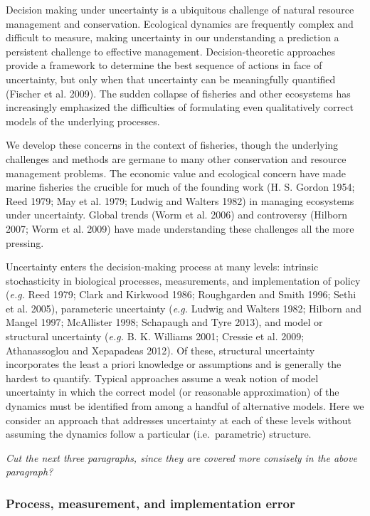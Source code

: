 \documentclass[author-year, review]{elsarticle} %
\begin{document}
Decision making under uncertainty is a ubiquitous challenge of natural
resource management and conservation. Ecological dynamics are frequently
complex and difficult to measure, making uncertainty in our
understanding a prediction a persistent challenge to effective
management. Decision-theoretic approaches provide a framework to
determine the best sequence of actions in face of uncertainty, but only
when that uncertainty can be meaningfully quantified (Fischer et al.
2009). The sudden collapse of fisheries and other ecosystems has
increasingly emphasized the difficulties of formulating even
qualitatively correct models of the underlying processes.

We develop these concerns in the context of fisheries, though the
underlying challenges and methods are germane to many other conservation
and resource management problems. The economic value and ecological
concern have made marine fisheries the crucible for much of the founding
work (H. S. Gordon 1954; Reed 1979; May et al. 1979; Ludwig and Walters
1982) in managing ecosystems under uncertainty. Global trends (Worm et
al. 2006) and controversy (Hilborn 2007; Worm et al. 2009) have made
understanding these challenges all the more pressing.

Uncertainty enters the decision-making process at many levels: intrinsic
stochasticity in biological processes, measurements, and implementation
of policy (\emph{e.g.} Reed 1979; Clark and Kirkwood 1986; Roughgarden
and Smith 1996; Sethi et al. 2005), parameteric uncertainty (\emph{e.g.}
Ludwig and Walters 1982; Hilborn and Mangel 1997; McAllister 1998;
Schapaugh and Tyre 2013), and model or structural uncertainty
(\emph{e.g.} B. K. Williams 2001; Cressie et al. 2009; Athanassoglou and
Xepapadeas 2012). Of these, structural uncertainty incorporates the
least a priori knowledge or assumptions and is generally the hardest to
quantify. Typical approaches assume a weak notion of model uncertainty
in which the correct model (or reasonable approximation) of the dynamics
must be identified from among a handful of alternative models. Here we
consider an approach that addresses uncertainty at each of these levels
without assuming the dynamics follow a particular (i.e.~parametric)
structure.

\emph{Cut the next three paragraphs, since they are covered more
consisely in the above paragraph?}

\subsubsection{Process, measurement, and implementation
error}\label{process-measurement-and-implementation-error}
\end{document}
